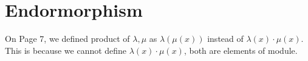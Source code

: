 
\section{Endormorphism}

On Page 7, we defined product of $\lambda, \mu$ as $\lambda(\mu(x))$ instead of $\lambda(x)\cdot\mu(x)$. This is because we cannot define $\lambda(x)\cdot\mu(x)$, both are elements of module. 